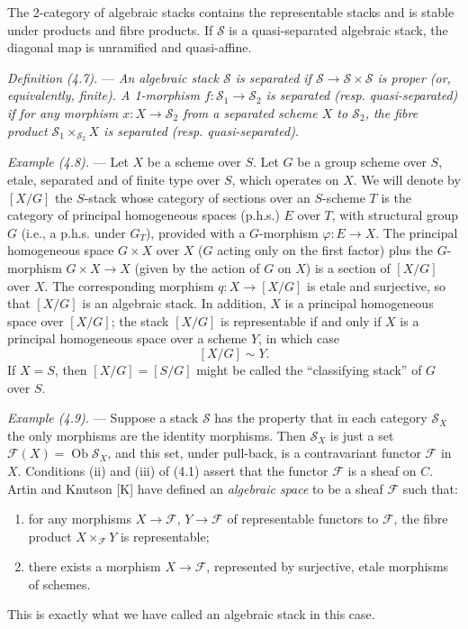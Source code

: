 \documentclass[10pt]{article}
\begin{document}
The 2-category of algebraic stacks contains the representable stacks and is stable under products and fibre products. If $\mathscr S$ is a quasi-separated algebraic stack, the diagonal map is unramified and quasi-affine.

\medskip
\noindent\emph{Definition (4.7).} --- \emph{An algebraic stack $\mathscr S$ is separated if $\mathscr S\to\mathscr S\times\mathscr S$ is proper (or, equivalently, finite). A 1-morphism $f:\mathscr S_1\to\mathscr S_2$ is separated (resp. quasi-separated) if for any morphism $x:X\to\mathscr S_2$ from a separated scheme $X$ to $\mathscr S_2$, the fibre product $\mathscr S_1\times_{\mathscr S_2}X$ is separated (resp. quasi-separated).}

\medskip
\noindent\emph{Example (4.8).} --- Let $X$ be a scheme over $S$. Let $G$ be a group scheme over $S$, etale, separated and of finite type over $S$, which operates on $X$. We will denote by $[X/G]$ the $S$-stack whose category of sections over an $S$-scheme $T$ is the category of principal homogeneous spaces (p.h.s.) $E$ over $T$, with structural group $G$ (i.e., a p.h.s. under $G_T$), provided with a $G$-morphism $\varphi:E\to X$. The principal homogeneous space $G\times X$ over $X$ ($G$ acting only on the first factor) plus the $G$-morphism $G\times X\to X$ (given by the action of $G$ on $X$) is a section of $[X/G]$ over $X$. The corresponding morphism $q:X\to[X/G]$ is etale and surjective, so that $[X/G]$ is an algebraic stack. In addition, $X$ is a principal homogeneous space over $[X/G]$; the stack $[X/G]$ is representable if and only if $X$ is a principal homogeneous space over a scheme $Y$, in which case
\[
[X/G]\sim Y.
\]
If $X=S$, then $[X/G]=[S/G]$ might be called the ``classifying stack'' of $G$ over $S$.

\medskip
\noindent\emph{Example (4.9).} --- Suppose a stack $\mathscr S$ has the property that in each category $\mathscr S_X$ the only morphisms are the identity morphisms. Then $\mathscr S_X$ is just a set $\mathscr F(X)=\operatorname{Ob}\mathscr S_X$, and this set, under pull-back, is a contravariant functor $\mathscr F$ in $X$. Conditions (ii) and (iii) of (4.1) assert that the functor $\mathscr F$ is a sheaf on $C$. Artin and Knutson [K] have defined an \emph{algebraic space} to be a sheaf $\mathscr F$ such that:
\begin{enumerate}[label=(\roman*)]
\item for any morphisms $X\to\mathscr F$, $Y\to\mathscr F$ of representable functors to $\mathscr F$, the fibre product $X\times_{\mathscr F}Y$ is representable;
\item there exists a morphism $X\to\mathscr F$, represented by surjective, etale morphisms of schemes.
\end{enumerate}
This is exactly what we have called an algebraic stack in this case.
\end{document}

